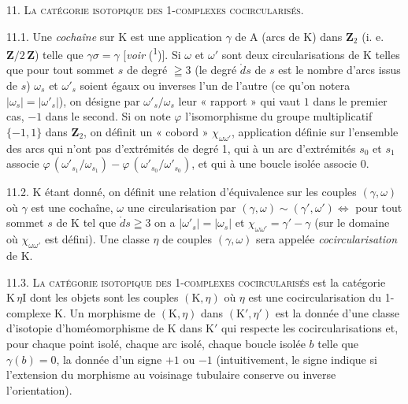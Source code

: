11. \textsc{La catégorie isotopique des 1-complexes cocircularisés.}

11.1. Une \textit{cochaîne} sur \(\mathrm{K}\) est une application \(\gamma\) de \(\mathrm{A}\) (arcs de \(\mathrm{K}\)) dans \(\mathbf{Z}_2\) (i. e. \(\mathbf{Z}/2\,\mathbf{Z}\)) telle que \(\gamma\sigma=\gamma\) [\textit{voir} (\textsuperscript{1})]. Si \(\omega\) et \(\omega'\) sont deux circularisations de \(\mathrm{K}\) telles que pour tout sommet \(s\) de degré \(\geqq3\) (le degré \(\mathring{d}s\) de \(s\) est le nombre d'arcs issus de \(s\)) \(\omega_s\) et \(\omega'_s\) soient égaux ou inverses l'un de l'autre (ce qu'on notera \(\lvert\omega_s\rvert=\lvert\omega'_s\rvert\)), on désigne par \(\omega'_s/\omega_s\) leur « rapport » qui vaut \(1\) dans le premier cas, \(-1\) dans le second. Si on note \(\varphi\) l'isomorphisme du groupe multiplicatif \(\{-1,1\}\) dans \(\mathbf{Z}_2\), on définit un « cobord » \(\chi_{\omega\omega'}\), application définie sur l'ensemble des arcs qui n'ont pas d'extrémités de degré 1, qui à un arc d'extrémités \(s_0\) et \(s_1\) associe \(\varphi\,(\omega'_{s_1}/\omega_{s_1})-\varphi\,(\omega'_{s_0}/\omega'_{s_0})\), et qui à une boucle isolée associe \(0\).

11.2. \(\mathrm{K}\) étant donné, on définit une relation d'équivalence sur les couples \((\gamma,\omega)\) où \(\gamma\) est une cochaîne, \(\omega\) une circularisation par \((\gamma,\omega)\sim(\gamma',\omega')\Leftrightarrow\) pour tout sommet \(s\) de \(\mathrm{K}\) tel que \(\mathring d s\geqq3\) on a \(\lvert\omega'_s\rvert=\lvert\omega_s\rvert\) et \(\chi_{\omega\omega'}=\gamma'-\gamma\) (sur le domaine où \(\chi_{\omega\omega'}\) est défini). Une classe \(\eta\) de couples \((\gamma,\omega)\) sera appelée \textit{cocircularisation} de \(\mathrm{K}\).

11.3. \textsc{La catégorie isotopique des 1-complexes cocircularisés} est la catégorie \(\mathrm{K}\,\eta{\scriptstyle\mathrm{I}}\) dont les objets sont les couples \((\mathrm{K},\eta)\) où \(\eta\) est une cocircularisation du 1-complexe \(\mathrm{K}\). Un morphisme de \((\mathrm{K},\eta)\) dans \((\mathrm{K}',\eta')\) est la donnée d'une classe d'isotopie d'homéomorphisme de \(\mathrm{K}\) dans \(\mathrm{K}'\) qui respecte les cocircularisations et, pour chaque point isolé, chaque arc isolé, chaque boucle isolée \(b\) telle que \(\gamma(b)=0\), la donnée d'un signe \(+1\) ou \(-1\) (intuitivement, le signe indique si l'extension du morphisme au voisinage tubulaire conserve ou inverse l'orientation).

